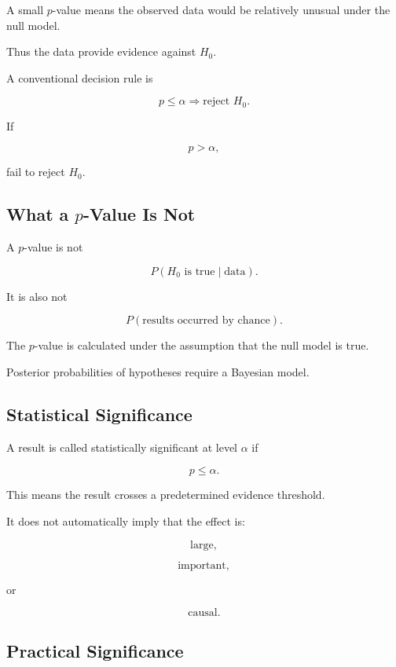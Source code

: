A small \(p\)-value means the observed data would be relatively unusual
under the null model.

Thus the data provide evidence against \(H_0\).

A conventional decision rule is

\[
\boxed{
p\leq\alpha
\Longrightarrow
\text{reject }H_0.
}
\]

If

\[
p>\alpha,
\]

fail to reject \(H_0\).

\subsection{What a \(p\)-Value Is Not}
\label{subsec:p-value-not}

A \(p\)-value is not

\[
\boxed{
P(H_0\text{ is true}\mid\text{data}).
}
\]

It is also not

\[
\boxed{
P(\text{results occurred by chance}).
}
\]

The \(p\)-value is calculated under the assumption that the null model
is true.

Posterior probabilities of hypotheses require a Bayesian model.

\subsection{Statistical Significance}
\label{subsec:statistical-significance}

A result is called statistically significant at level \(\alpha\) if

\[
\boxed{
p\leq\alpha.
}
\]

This means the result crosses a predetermined evidence threshold.

It does not automatically imply that the effect is:

\[
\boxed{
\text{large},
}
\]

\[
\boxed{
\text{important},
}
\]

or

\[
\boxed{
\text{causal}.
}
\]

\subsection{Practical Significance}
\label{subsec:practical-significance}

